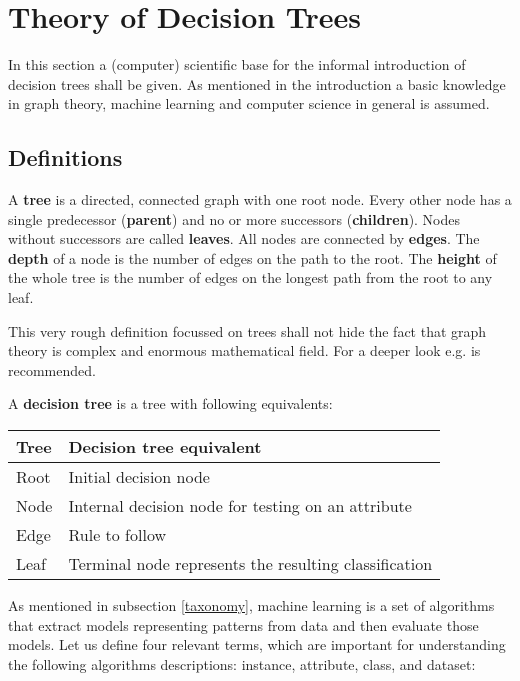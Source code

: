 
\section{Theory of Decision Trees}

In this section a (computer) scientific base for the informal introduction of decision trees shall be given. As mentioned in the introduction a basic knowledge in graph theory, machine learning and computer science in general is assumed.


\subsection{Definitions}

\begin{definition}
A \textbf{tree} is a directed, connected graph with one root node. Every other node has a single predecessor (\textbf{parent}) and no or more successors (\textbf{children}). Nodes without successors are called \textbf{leaves}. All nodes are connected by \textbf{edges}. The \textbf{depth} of a node is the number of edges on the path to the root. The \textbf{height} of the whole tree is the number of edges on the longest path from the root to any leaf. 
\end{definition}

\begin{remark}
This very rough definition focussed on trees shall not hide the fact that graph theory is complex and enormous mathematical field. For a deeper look e.g. \cite{cormen2001introduction} is recommended.
\end{remark}

\begin{definition}
A \textbf{decision tree} is a tree with following equivalents:
\begin{center}
\begin{tabular}{l|l} 
    \textbf{Tree} &  \textbf{Decision tree equivalent} \\ \hline
    Root & Initial decision node  \\ 
    Node & Internal decision node for testing on an attribute  \\ 
    Edge & Rule to follow \\ 
    Leaf & Terminal node represents the resulting classification 
\end{tabular}
\end{center}
\end{definition}

As mentioned in subsection \ref{taxonomy}, machine learning is a set of algorithms that extract models representing patterns from data and then evaluate those models. Let us define four relevant terms, which are important for understanding the following algorithms descriptions: instance, attribute, class, and dataset:

